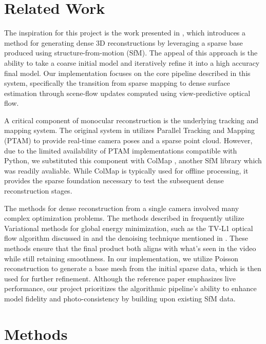\documentclass[10pt,twocolumn]{article}
\begin{document}
\section{Related Work}

The inspiration for this project is the work presented in \cite{newcombe2010}, which introduces a method for generating dense 3D reconstructions by leveraging a sparse base produced using structure-from-motion (SfM). The appeal of this approach is the ability to take a coarse initial model and iteratively refine it into a high accuracy final model. Our implementation focuses on the core pipeline described in this system, specifically the transition from sparse mapping to dense surface estimation through scene-flow updates computed using view-predictive optical flow.

A critical component of monocular reconstruction is the underlying tracking and mapping system. The original system in \cite{newcombe2010} utilizes Parallel Tracking and Mapping (PTAM) \cite{PTAM} to provide real-time camera poses and a sparse point cloud. However, due to the limited availability of PTAM implementations compatible with Python, we substituted this component with ColMap \cite{COLMAP}, another SfM library which was readily avaliable. While ColMap is typically used for offline processing, it provides the sparse foundation necessary to test the subsequent dense reconstruction stages.

The methods for dense reconstruction from a single camera involved many complex optimization problems. The methods described in \cite{newcombe2010} frequently utilize Variational methods for global energy minimization, such as the TV-L1 optical flow algorithm discussed in \cite{TV-L1} and the denoising technique mentioned in \cite{newcombe2010}. These methods ensure that the final product both aligns with what's seen in  the video while still retaining smoothness. In our implementation, we utilize Poisson reconstruction \cite{Poisson} to generate a base mesh from the initial sparse data, which is then used for further refinement. Although the reference paper \cite{newcombe2010} emphasizes live performance, our project prioritizes the algorithmic pipeline's ability to enhance model fidelity and photo-consistency by building upon existing SfM data.

\section{Methods}
\end{document}
